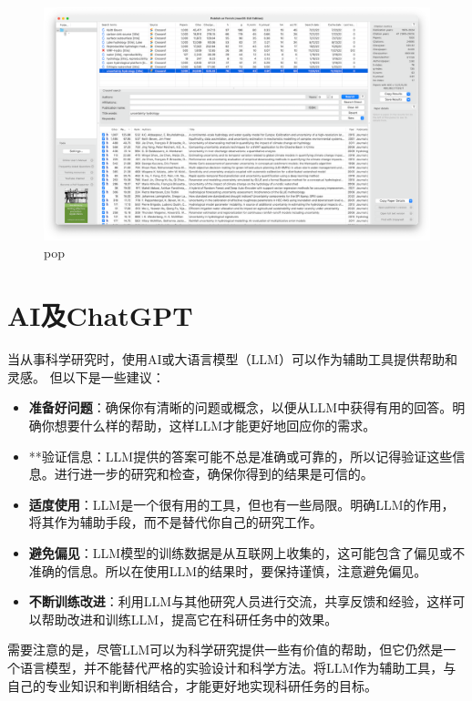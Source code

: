 \documentclass[
]{ctexbook}
\providecommand{\tightlist}{%
  \setlength{\itemsep}{0pt}\setlength{\parskip}{0pt}}
\begin{document}
\begin{figure}
\centering
\includegraphics{Fig/skill/pop.png}
\caption{pop}
\end{figure}

\hypertarget{aiux53cachatgpt}{%
\section{AI及ChatGPT}\label{aiux53cachatgpt}}

当从事科学研究时，使用AI或大语言模型（LLM）可以作为辅助工具提供帮助和灵感。
但以下是一些建议：

\begin{itemize}
\tightlist
\item
  \textbf{准备好问题}：确保你有清晰的问题或概念，以便从LLM中获得有用的回答。明确你想要什么样的帮助，这样LLM才能更好地回应你的需求。
\item
  **验证信息：LLM提供的答案可能不总是准确或可靠的，所以记得验证这些信息。进行进一步的研究和检查，确保你得到的结果是可信的。
\item
  \textbf{适度使用}：LLM是一个很有用的工具，但也有一些局限。明确LLM的作用，将其作为辅助手段，而不是替代你自己的研究工作。
\item
  \textbf{避免偏见}：LLM模型的训练数据是从互联网上收集的，这可能包含了偏见或不准确的信息。所以在使用LLM的结果时，要保持谨慎，注意避免偏见。
\item
  \textbf{不断训练改进}：利用LLM与其他研究人员进行交流，共享反馈和经验，这样可以帮助改进和训练LLM，提高它在科研任务中的效果。
\end{itemize}

需要注意的是，尽管LLM可以为科学研究提供一些有价值的帮助，但它仍然是一个语言模型，并不能替代严格的实验设计和科学方法。将LLM作为辅助工具，与自己的专业知识和判断相结合，才能更好地实现科研任务的目标。
\end{document}
